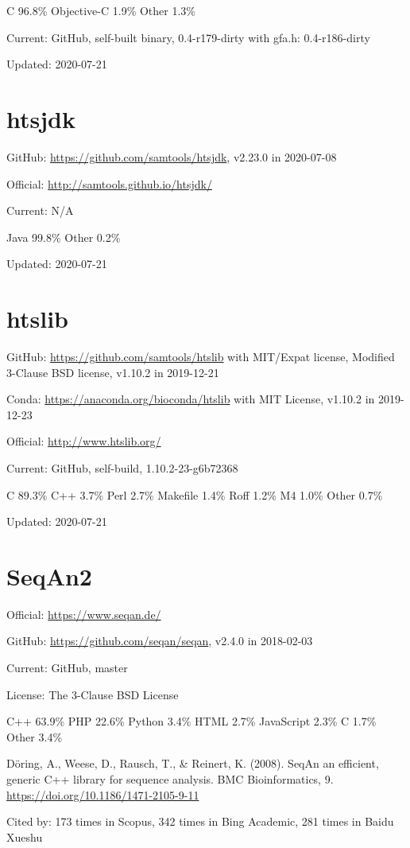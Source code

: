 \documentclass[]{article}
\newcommand{\cb}[3]{\par Cited by: {\color{blue}\Huge #1} times in Scopus, {\color{blue}\Huge #2} times in Bing Academic, {\color{blue}\Huge #3} times in Baidu Xueshu}
\begin{document}
C 96.8\% Objective-C 1.9\% Other 1.3\%

Current: GitHub, self-built binary, 0.4-r179-dirty with gfa.h: 0.4-r186-dirty

Updated: 2020-07-21

\section{htsjdk}

GitHub: \url{https://github.com/samtools/htsjdk}, v2.23.0 in 2020-07-08

Official: \url{http://samtools.github.io/htsjdk/}

Current: N/A

Java 99.8\% Other 0.2\%

Updated: 2020-07-21

\section{htslib}

GitHub: \url{https://github.com/samtools/htslib} with MIT/Expat license, Modified 3-Clause BSD license, v1.10.2 in 2019-12-21 

Conda: \url{https://anaconda.org/bioconda/htslib} with MIT License, v1.10.2 in 2019-12-23

Official: \url{http://www.htslib.org/}

Current: GitHub, self-build,  1.10.2-23-g6b72368

C 89.3\% C++ 3.7\% Perl 2.7\% Makefile 1.4\% Roff 1.2\% M4 1.0\% Other 0.7\%

Updated: 2020-07-21

\section{SeqAn2}

Official: \url{https://www.seqan.de/}

GitHub: \url{https://github.com/seqan/seqan}, v2.4.0 in 2018-02-03

Current: GitHub, master

License: The 3-Clause BSD License

C++ 63.9\% PHP 22.6\% Python 3.4\% HTML 2.7\% JavaScript 2.3\% C 1.7\% Other 3.4\%

Döring, A., Weese, D., Rausch, T., \& Reinert, K. (2008). SeqAn an efficient, generic C++ library for sequence analysis. BMC Bioinformatics, 9. \url{https://doi.org/10.1186/1471-2105-9-11} \cb{173}{342}{281}
\end{document}
